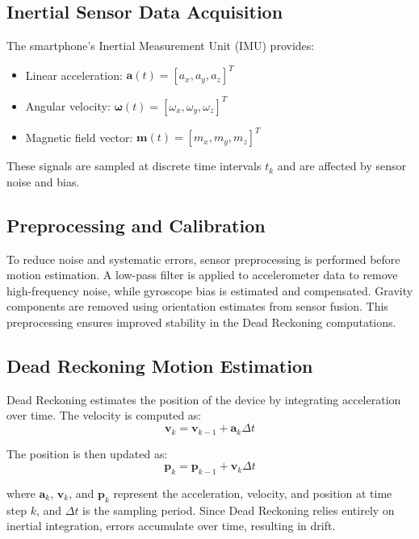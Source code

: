 \documentclass[conference]{IEEEtran}
\begin{document}
\subsection{Inertial Sensor Data Acquisition}

The smartphone’s Inertial Measurement Unit (IMU) provides:
\begin{itemize}
\item Linear acceleration: $\mathbf{a}(t) = [a_x, a_y, a_z]^T$
\item Angular velocity: $\boldsymbol{\omega}(t) = [\omega_x, \omega_y, \omega_z]^T$
\item Magnetic field vector: $\mathbf{m}(t) = [m_x, m_y, m_z]^T$
\end{itemize}

These signals are sampled at discrete time intervals $t_k$ and are affected by sensor noise and bias.

\subsection{Preprocessing and Calibration}

To reduce noise and systematic errors, sensor preprocessing is performed before motion estimation. A low-pass filter is applied to accelerometer data to remove high-frequency noise, while gyroscope bias is estimated and compensated. Gravity components are removed using orientation estimates from sensor fusion. This preprocessing ensures improved stability in the Dead Reckoning computations.

\subsection{Dead Reckoning Motion Estimation}

Dead Reckoning estimates the position of the device by integrating acceleration over time. The velocity is computed as:
\begin{equation}
\mathbf{v}_k = \mathbf{v}_{k-1} + \mathbf{a}_k \Delta t
\end{equation}

The position is then updated as:
\begin{equation}
\mathbf{p}_k = \mathbf{p}_{k-1} + \mathbf{v}_k \Delta t
\end{equation}

where $\mathbf{a}_k$, $\mathbf{v}_k$, and $\mathbf{p}_k$ represent the acceleration, velocity, and position at time step $k$, and $\Delta t$ is the sampling period. Since Dead Reckoning relies entirely on inertial integration, errors accumulate over time, resulting in drift.
\end{document}
